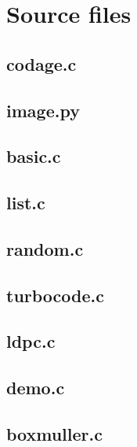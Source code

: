 \documentclass{article}
\author{Tom Hubrecht}
\begin{document}
\tableofcontents
\newpage


\section{Source files}


\subsection{codage.c}

\newpage

\subsection{image.py}

\newpage

\subsection{basic.c}

\newpage

\subsection{list.c}

\newpage

\subsection{random.c}

\newpage

\subsection{turbocode.c}

\newpage

\subsection{ldpc.c}

\newpage

\subsection{demo.c}

\newpage

\subsection{boxmuller.c}

\newpage
\end{document}
